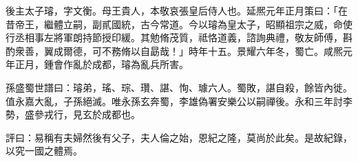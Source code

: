 
\begin{pinyinscope}
後主太子璿，字文衡。母王貴人，本敬哀張皇后侍人也。延熈元年正月策曰：「在昔帝王，繼體立嗣，副貳國統，古今常道。今以璿為皇太子，昭顯祖宗之威，命使行丞相事左將軍朗持節授印緩。其勉脩茂質，祗恪道義，諮詢典禮，敬友師傅，斟酌衆善，翼成爾德，可不務脩以自勗哉！」時年十五。景耀六年冬，蜀亡。咸熈元年正月，鍾會作亂於成都，璿為亂兵所害。

孫盛蜀世譜曰：璿弟，瑤、琮、瓚、諶、恂、璩六人。蜀敗，諶自殺，餘皆內徙。值永嘉大亂，子孫絕滅。唯永孫玄奔蜀，李雄偽署安樂公以嗣禪後。永和三年討李勢，盛參戎行，見玄於成都也。

評曰：易稱有夫婦然後有父子，夫人倫之始，恩紀之隆，莫尚於此矣。是故紀錄，以究一國之體焉。


\end{pinyinscope}
